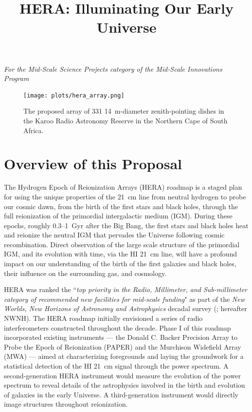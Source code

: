 \documentclass[preprint]{aastex}
\def\HI{{H{\small I }}}
\begin{document}
\title{HERA: Illuminating Our Early Universe}
{\it For the Mid-Scale Science Projects category of the Mid-Scale
Innovations Program}

\begin{figure}[H]\centering
\texttt{[image: plots/hera\_array.png]}
\caption{The proposed array of 331 14~m-diameter zenith-pointing dishes in the Karoo Radio Astronomy Reserve
in the Northern Cape of South Africa.
}\label{fig:hera_array} \end{figure}


\vspace{-0.4in}
\section{Overview of this Proposal} %

The Hydrogen Epoch of Reionization Arrays (HERA) roadmap is a staged
plan for using the unique properties of the 21~cm line from neutral
hydrogen to probe our cosmic dawn, from the birth of the first 
stars and black holes, through the full reionization of the primordial
intergalactic medium (IGM). 
During these epochs, roughly 0.3--1~Gyr after the Big Bang, the
first stars and black holes heat and reionize the neutral
IGM that pervades the Universe following cosmic
recombination. Direct observation of the large scale structure of the primordial
IGM, and its evolution with time, via the \HI 21~cm line, will
have a profound impact on our understanding of the birth of the first
galaxies and black holes, their influence on the surrounding gas,
and cosmology. 

HERA was ranked the ``{\it top priority in the Radio, Millimeter, and
Sub-millimeter category of recommended new facilities for mid-scale
funding}" as part of the {\it New Worlds, New Horizons of Astronomy
and Astrophysics} decadal survey (\citealt{astro2010}; hereafter
NWNH).  The HERA roadmap initially envisioned a series of radio
interferometers constructed throughout the decade. Phase I of this roadmap
incorporated existing instruments --- the Donald C. Backer Precision Array to Probe the Epoch of
Reionization (PAPER) and the Murchison Widefield Array (MWA) ---
aimed at characterizing foregrounds and laying the
groundwork for a statistical detection of the HI 21~cm signal through
the power spectrum.  A second-generation HERA instrument would measure
the evolution of the power spectrum to reveal details of the astrophysics
involved in the birth and evolution of galaxies 
in the early Universe. A third-generation instrument would
directly image structures throughout reionization.
\end{document}
